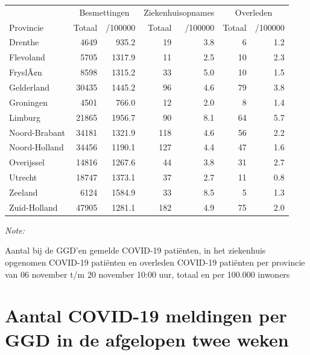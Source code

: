 \documentclass[
  english,
  man,floatsintext]{apa6}
\begin{document}
\begin{table}
\centering
\begin{threeparttable}
\begin{tabular}{lrrrrrr}
\toprule
\multicolumn{1}{c}{ } & \multicolumn{2}{c}{Besmettingen} & \multicolumn{2}{c}{Ziekenhuisopnames} & \multicolumn{2}{c}{Overleden} \\
\cmidrule(l{3pt}r{3pt}){2-3} \cmidrule(l{3pt}r{3pt}){4-5} \cmidrule(l{3pt}r{3pt}){6-7}
Provincie & Totaal & /100000 & Totaal & /100000 & Totaal & /100000\\
\midrule
Drenthe & 4649 & 935.2 & 19 & 3.8 & 6 & 1.2\\
Flevoland & 5705 & 1317.9 & 11 & 2.5 & 10 & 2.3\\
FryslÃ¢n & 8598 & 1315.2 & 33 & 5.0 & 10 & 1.5\\
Gelderland & 30435 & 1445.2 & 96 & 4.6 & 79 & 3.8\\
Groningen & 4501 & 766.0 & 12 & 2.0 & 8 & 1.4\\
Limburg & 21865 & 1956.7 & 90 & 8.1 & 64 & 5.7\\
Noord-Brabant & 34181 & 1321.9 & 118 & 4.6 & 56 & 2.2\\
Noord-Holland & 34456 & 1190.1 & 127 & 4.4 & 47 & 1.6\\
Overijssel & 14816 & 1267.6 & 44 & 3.8 & 31 & 2.7\\
Utrecht & 18747 & 1373.1 & 37 & 2.7 & 11 & 0.8\\
Zeeland & 6124 & 1584.9 & 33 & 8.5 & 5 & 1.3\\
Zuid-Holland & 47905 & 1281.1 & 182 & 4.9 & 75 & 2.0\\
\bottomrule
\end{tabular}
\begin{tablenotes}
\item \textit{Note: } 
\item Aantal bij de GGD’en gemelde COVID-19 patiënten, in het ziekenhuis opgenomen COVID-19 patiënten en overleden COVID-19 patiënten per provincie van 06 november t/m 20 november 10:00 uur, totaal en per 100.000 inwoners
\end{tablenotes}
\end{threeparttable}
\end{table}

\newpage

\hypertarget{aantal-covid-19-meldingen-per-ggd-in-de-afgelopen-twee-weken}{%
\section{Aantal COVID-19 meldingen per GGD in de afgelopen twee weken}\label{aantal-covid-19-meldingen-per-ggd-in-de-afgelopen-twee-weken}}
\end{document}
